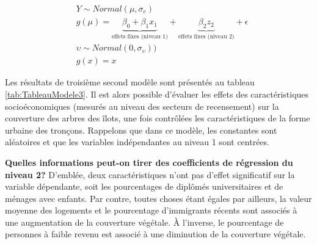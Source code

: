 \documentclass[
  11pt,
  french,
]{book}
\begin{document}
\footnotesize

\begin{equation}
\begin{aligned}
&Y \sim Normal(\mu,\sigma_e)\\
&g(\mu)  = \underbrace{\beta_0 + \beta_1 x_1}_{\mbox{effets fixes (niveau 1)}}+ \underbrace{\beta_2 z_2}_{\mbox{effets fixes (niveau 2)}}+\epsilon \\
&\upsilon \sim Normal(0, \sigma_{\upsilon})) \\
&g(x) = x
\end{aligned}
\label{eq:multiniveauModele3}
\end{equation}
\normalsize

Les résultats de troisième second modèle sont présentés au tableau \ref{tab:TableauModele3}. Il est alors possible d'évaluer les effets des caractéristiques socioéconomiques (mesurés au niveau des secteurs de recensement) sur la couverture des arbres des îlots, une fois contrôlées les caractéristiques de la forme urbaine des tronçons. Rappelons que dans ce modèle, les constantes sont aléatoires et que les variables indépendantes au niveau 1 sont centrées.

\textbf{Quelles informations peut-on tirer des coefficients de régression du niveau 2?}
D'emblée, deux caractéristiques n'ont pas d'effet significatif sur la variable dépendante, soit les pourcentages de diplômés universitaires et de ménages avec enfants. Par contre, toutes choses étant égales par ailleurs, la valeur moyenne des logements et le pourcentage d'immigrants récents sont associés à une augmentation de la couverture végétale. À l'inverse, le pourcentage de personnes à faible revenu est associé à une diminution de la couverture végétale.
\end{document}
